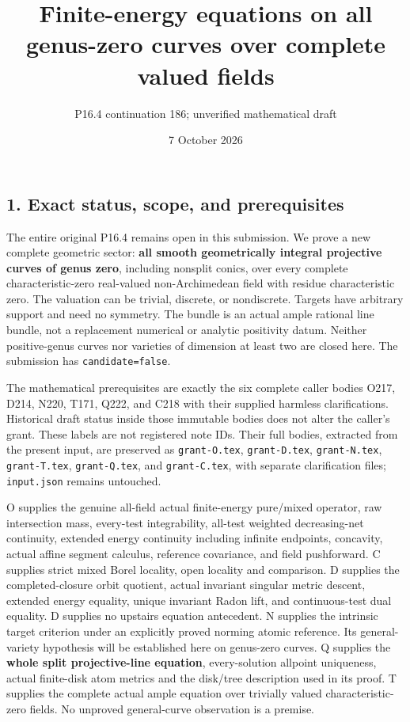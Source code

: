 \documentclass[
  11pt,
]{article}
\title{Finite-energy equations on all genus-zero curves over complete
valued fields}
\author{P16.4 continuation 186; unverified mathematical draft}
\date{7 October 2026}
\begin{document}
\maketitle

\subsection{1. Exact status, scope, and
prerequisites}\label{exact-status-scope-and-prerequisites}

The entire original P16.4 remains open in this submission. We prove a
new complete geometric sector: \textbf{all smooth geometrically integral
projective curves of genus zero}, including nonsplit conics, over every
complete characteristic-zero real-valued non-Archimedean field with
residue characteristic zero. The valuation can be trivial, discrete, or
nondiscrete. Targets have arbitrary support and need no symmetry. The
bundle is an actual ample rational line bundle, not a replacement
numerical or analytic positivity datum. Neither positive-genus curves
nor varieties of dimension at least two are closed here. The submission
has \texttt{candidate=false}.

The mathematical prerequisites are exactly the six complete caller
bodies O217, D214, N220, T171, Q222, and C218 with their supplied
harmless clarifications. Historical draft status inside those immutable
bodies does not alter the caller's grant. These labels are not
registered note IDs. Their full bodies, extracted from the present
input, are preserved as \texttt{grant-O.tex}, \texttt{grant-D.tex},
\texttt{grant-N.tex}, \texttt{grant-T.tex}, \texttt{grant-Q.tex}, and
\texttt{grant-C.tex}, with separate clarification files;
\texttt{input.json} remains untouched.

O supplies the genuine all-field actual finite-energy pure/mixed
operator, raw intersection mass, every-test integrability, all-test
weighted decreasing-net continuity, extended energy continuity including
infinite endpoints, concavity, actual affine segment calculus, reference
covariance, and field pushforward. C supplies strict mixed Borel
locality, open locality and comparison. D supplies the completed-closure
orbit quotient, actual invariant singular metric descent, extended
energy equality, unique invariant Radon lift, and continuous-test dual
equality. D supplies no upstairs equation antecedent. N supplies the
intrinsic target criterion under an explicitly proved norming atomic
reference. Its general-variety hypothesis will be established here on
genus-zero curves. Q supplies the \textbf{whole split projective-line
equation}, every-solution allpoint uniqueness, actual finite-disk atom
metrics and the disk/tree description used in its proof. T supplies the
complete actual ample equation over trivially valued characteristic-zero
fields. No unproved general-curve observation is a premise.
\end{document}
